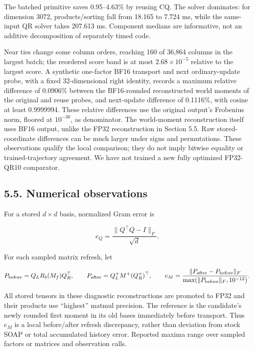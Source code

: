 The batched primitive saves 0.95--4.63\% by reusing CQ. The solver
dominates: for dimension 3072, products/sorting fall from 18.165 to
7.724 ms, while the same-input QR solver takes 207.613 ms. Component
medians are informative, not an additive decomposition of separately
timed code.

Near ties change some column orders, reaching 160 of 36,864 columns in
the largest batch; the reordered score band is at most
\(2.68\times10^{-5}\) relative to the largest score. A synthetic
one-factor BF16 transport and next ordinary-update probe, with a fixed
32-dimensional right identity, records a maximum relative difference of
0.0906\% between the BF16-rounded reconstructed world moments of the
original and reuse probes, and next-update difference of 0.1116\%, with
cosine at least 0.9999994. These relative differences use the original
output's Frobenius norm, floored at \(10^{-30}\), as denominator. The
world-moment reconstruction itself uses BF16 output, unlike the FP32
reconstruction in Section 5.5. Raw stored-coordinate differences can be
much larger under signs and permutations. These observations qualify the
local comparison; they do not imply bitwise equality or
trained-trajectory agreement. We have not trained a new fully optimized
FP32-QR10 comparator.

\hypertarget{numerical-observations}{%
\subsection{5.5. Numerical observations}\label{numerical-observations}}

For a stored \(d\times d\) basis, normalized Gram error is

\[
e_Q=\frac{\|Q^\top Q-I\|_F}{\sqrt d}.
\]

For each sampled matrix refresh, let

\[
P_{\rm before}=Q_L R_b(M_f)Q_R^\top,\qquad
P_{\rm after}=Q_L^+ M^+ (Q_R^+)^\top,\qquad
e_M=\frac{\|P_{\rm after}-P_{\rm before}\|_F}
{\max(\|P_{\rm before}\|_F,10^{-12})}.
\]

All stored tensors in these diagnostic reconstructions are promoted to
FP32 and their products use ``highest'' matmul precision. The reference
is the candidate's newly rounded first moment in its old bases
immediately before transport. Thus \(e_M\) is a local before/after
refresh discrepancy, rather than deviation from stock SOAP or total
accumulated history error. Reported maxima range over sampled factors or
matrices and observation calls.

